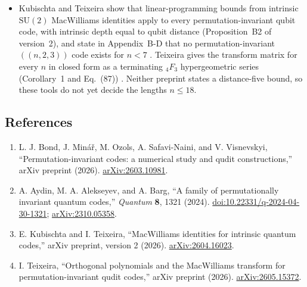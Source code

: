 \begin{itemize}
  \item Kubischta and Teixeira show that linear-programming bounds from intrinsic
  $\mathrm{SU}(2)$ MacWilliams identities apply to every permutation-invariant
  qubit code, with intrinsic depth equal to qubit distance (Proposition~B2 of
  version~2), and state in Appendix~B-D that no permutation-invariant
  $((n,2,3))$ code exists for $n<7$ .
  Teixeira gives the transform matrix for every $n$ in closed form as a
  terminating ${}_4F_3$ hypergeometric series (Corollary~1 and Eq.~(87))
  .  Neither preprint states a
  distance-five bound, so these tools do not yet decide the lengths
  $n\leq18$.
\end{itemize}

\subsection*{References}

\begin{enumerate}[label={},leftmargin=4.8em,labelsep=0.5em]
  \footnotesize
  \item[\textup{[BMO+26]}]\label{ref:a727-bond-et-al}
  L. J. Bond, J. Min\'a\v{r}, M. Ozols, A. Safavi-Naini, and V. Visnevskyi,
  ``Permutation-invariant codes: a numerical study and qudit constructions,''
  arXiv preprint (2026).
  \href{https://arxiv.org/abs/2603.10981}{arXiv:2603.10981}.

  \item[\textup{[AAB24]}]\label{ref:a727-aab}
  A. Aydin, M. A. Alekseyev, and A. Barg, ``A family of permutationally
  invariant quantum codes,'' \emph{Quantum} \textbf{8}, 1321 (2024).
  \href{https://doi.org/10.22331/q-2024-04-30-1321}{doi:10.22331/q-2024-04-30-1321};
  \href{https://arxiv.org/abs/2310.05358}{arXiv:2310.05358}.

  \item[\textup{[KT26]}]\label{ref:a727-kubischta-teixeira}
  E. Kubischta and I. Teixeira, ``MacWilliams identities for intrinsic quantum
  codes,'' arXiv preprint, version 2 (2026).
  \href{https://arxiv.org/abs/2604.16023}{arXiv:2604.16023}.

  \item[\textup{[Tei26]}]\label{ref:a727-teixeira}
  I. Teixeira, ``Orthogonal polynomials and the MacWilliams transform for
  permutation-invariant qudit codes,'' arXiv preprint (2026).
  \href{https://arxiv.org/abs/2605.15372}{arXiv:2605.15372}.
\end{enumerate}

